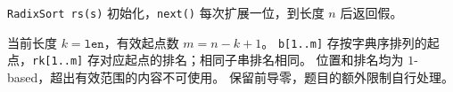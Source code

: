 \texttt{RadixSort rs(s)} 初始化，\texttt{next()} 每次扩展一位，到长度 $n$ 后返回假。

当前长度 $k=\texttt{len}$，有效起点数 $m=n-k+1$。
\texttt{b[1..m]} 存按字典序排列的起点，\texttt{rk[1..m]} 存对应起点的排名；相同子串排名相同。
位置和排名均为 $1$-based，超出有效范围的内容不可使用。
保留前导零，题目的额外限制自行处理。

